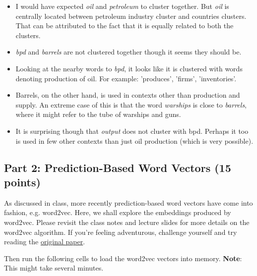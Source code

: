 \documentclass[11pt]{article}
\begin{document}
\begin{itemize}
\item
  I would have expected \emph{oil} and \emph{petroleum} to cluster
  together. But \emph{oil} is centrally located between petroleum
  industry cluster and countries clusters. That can be attributed to the
  fact that it is equally related to both the clusters.
\item
  \emph{bpd} and \emph{barrels} are not clustered together though it
  seems they should be.
\item
  Looking at the nearby words to \emph{bpd}, it looks like it is
  clustered with words denoting production of oil. For example:
  'produces', 'firms', 'inventories'.
\item
  Barrels, on the other hand, is used in contexts other than production
  and supply. An extreme case of this is that the word \emph{warships}
  is close to \emph{barrels}, where it might refer to the tube of
  warships and guns.
\item
  It is surprising though that \emph{output} does not cluster with bpd.
  Perhaps it too is used in few other contexts than just oil production
  (which is very possible).
\end{itemize}

    \subsection{Part 2: Prediction-Based Word Vectors (15
points)}\label{part-2-prediction-based-word-vectors-15-points}

As discussed in class, more recently prediction-based word vectors have
come into fashion, e.g. word2vec. Here, we shall explore the embeddings
produced by word2vec. Please revisit the class notes and lecture slides
for more details on the word2vec algorithm. If you're feeling
adventurous, challenge yourself and try reading the
\href{https://papers.nips.cc/paper/5021-distributed-representations-of-words-and-phrases-and-their-compositionality.pdf}{original
paper}.

Then run the following cells to load the word2vec vectors into memory.
\textbf{Note}: This might take several minutes.
\end{document}
